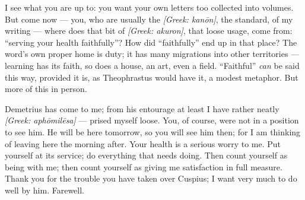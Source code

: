 

 I see what you are up to: you want your own letters too collected into volumes. But come now --- you, who are usually the \textit{[Greek: kan\=on]}, the standard, of my writing --- where does that bit of \textit{[Greek: akuron]}, that loose usage, come from: ``serving your health faithfully''? How did ``faithfully'' end up in that place? The word's own proper home is duty; it has many migrations into other territories --- learning has its faith, so does a house, an art, even a field. ``Faithful'' \textit{can} be said this way, provided it is, as Theophrastus would have it, a modest metaphor. But more of this in person.

 Demetrius has come to me; from his entourage at least I have rather neatly \textit{[Greek: aph\=omil\=esa]} ---  prised myself loose. You, of course, were not in a position to see him. He will be here tomorrow, so you will see him then; for I am thinking of leaving here the morning after. Your health is a serious worry to me. Put yourself at its service; do everything that needs doing. Then count yourself as being with me; then count yourself as giving me satisfaction in full measure. Thank you for the trouble you have taken over Cuspius; I want very much to do well by him. Farewell.
